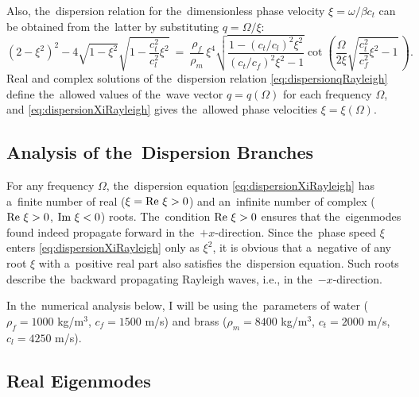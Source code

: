 Also, the~dispersion relation for the~dimensionless phase velocity $\xi=\omega/\beta c_t$ can be obtained from the~latter by substituting $q=\Omega /\xi$:
\begin{equation}
\label{eq:dispersionXiRayleigh}
\left(2-\xi^2\right)^2-4\sqrt{1-\xi^2}\sqrt{1-\frac{c_t^2}{c_l^2}\xi^2}
~=~\frac{\rho_f}{\rho_m}\,\xi^4 \sqrt{\frac{1-\left(c_t/c_l\right)^2\xi^2}{\left(c_t/c_f\right)^2\xi^2-1}}\cot\!\left(\frac{\Omega}{2\xi}\sqrt{\frac{c_t^2}{c_f^2} \xi^2-1}\,\right).
\end{equation}
Real and complex solutions of the~dispersion relation \cref{eq:dispersionqRayleigh} define the~allowed values of the~wave vector $q = q(\Omega)$ for each frequency $\Omega$, and \cref{eq:dispersionXiRayleigh} gives the~allowed phase velocities $\xi = \xi(\Omega)$.


\subsection{Analysis of the~Dispersion Branches}

For any frequency $\Omega$, the~dispersion equation \cref{eq:dispersionXiRayleigh} has a~finite number of real ($\xi = \textrm{Re } \xi > 0$) and an~infinite number of complex ($\textrm{Re } \xi > 0$, $\textrm{Im } \xi < 0$) roots.
The~condition $\textrm{Re }\xi>0$ ensures that the~eigenmodes found indeed propagate forward in the~$+x$-direction.
Since the~phase speed $\xi$ enters \cref{eq:dispersionXiRayleigh} only as $\xi^2$, it is obvious that a~negative of any root $\xi$ with a~positive real part also satisfies the~dispersion equation.
Such roots describe the~backward propagating Rayleigh waves, i.e., in the~$-x$-direction.

In the~numerical analysis below, I will be using the~parameters of water ($\rho_f=1000$ kg/m$^3$, $c_f=1500$ m/s) and brass ($\rho_m=8400$ kg/m$^3$, $c_t=2000$ m/s, $c_l=4250$ m/s).

\subsection{Real Eigenmodes}


